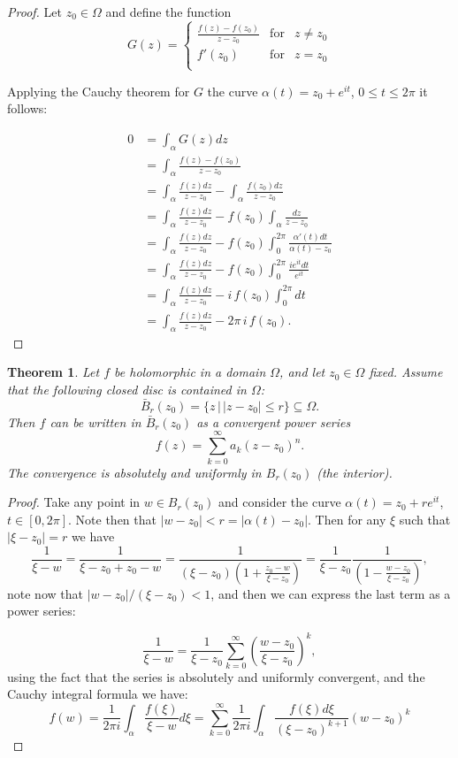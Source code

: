 \documentclass{amsart}
\newtheorem{thm}{Theorem}
\begin{document}
\begin{proof}
Let \(z_0 \in \Omega\) and define the function
\[ G(z) = \left\{ \begin{array}{ccc}
\frac{f(z) - f(z_0)}{z - z_0} & \mbox{for} & z \neq z_0\\
f'(z_0) & \mbox{for} & z = z_0\\
\end{array} \right. \]

Applying the Cauchy theorem for \(G\) the curve \(\alpha(t) = z_0 + e^{it}\), \(0\leq t \leq 2\pi\)  it follows:

\begin{align*}
0 & =  \int_{\alpha} G(z) dz \\ 
& = \int_{\alpha} \frac{f(z) - f(z_0)}{z-z_0} \\ 
&= \int_{\alpha}\frac{f(z)dz}{z-z_0} - \int_{\alpha}\frac{f(z_0) dz}{z - z_0} \\
&= \int_{\alpha}\frac{f(z)dz}{z-z_0} - f(z_0) \int_{\alpha}\frac{dz}{z - z_0}\\
&= \int_{\alpha}\frac{f(z)dz}{z-z_0} - f(z_0) \int_{0}^{2\pi}\frac{\alpha'(t)dt}{\alpha(t) - z_0}\\
&= \int_{\alpha}\frac{f(z)dz}{z-z_0} - f(z_0) \int_{0}^{2\pi}\frac{i e^{it}dt}{e^{it}}\\
&= \int_{\alpha}\frac{f(z)dz}{z-z_0} - i\, f(z_0) \int_{0}^{2\pi}dt\\
&= \int_{\alpha}\frac{f(z)dz}{z-z_0} - 2\pi\,i\, f(z_0).
\end{align*}
\end{proof}


\begin{thm}
Let \(f\) be holomorphic in a domain \(\Omega\), and let \(z_0\in \Omega\) fixed. Assume that the following closed disc is contained in \(\Omega\):
\[ \bar{B}_r(z_0) = \{ z \, | \, |z-z_0| \leq r \} \subseteq \Omega. \]
Then \(f\) can be written in \(\bar{B}_r(z_0)\) as a convergent power series 
\[ f(z) = \sum_{k=0}^\infty a_k (z - z_0)^n.\]
The convergence is absolutely and uniformly in \(B_r(z_0)\) (the interior).
\end{thm}

\begin{proof}
Take any point in \(w\in B_r(z_0)\) and consider the curve \(\alpha(t) = z_0 + r e^{it}\), \(t\in [0,2\pi]\). Note then that \(|w-z_0| < r = |\alpha(t) - z_0|\). Then for any \(\xi\) such that \(|\xi - z_0| = r\) we have
\[ \frac{1}{\xi - w} = \frac{1}{\xi - z_0 + z_0 - w} = \frac{1}{(\xi - z_0)\left( 1 + \frac{z_0 - w }{ \xi - z_0}\right) }= \frac{1}{\xi - z_0}\frac{1}{\left( 1 - \frac{w - z_0 }{ \xi - z_0}\right) }, \]
note now that \(|w-z_0|/(\xi-z_0) < 1\), and then we can express the last term as  a power series:

\[ \frac{1}{\xi - w}  = \frac{1}{\xi-z_0}\sum_{k=0}^{\infty}\left( \frac{w - z_0 }{ \xi - z_0}\right)^k, \]
using the fact that  the series is absolutely and uniformly convergent, and the Cauchy integral formula we have:
\[ f(w) = \frac{1}{2\pi i} \int_{\alpha} \frac{f(\xi)}{\xi - w}d\xi = \sum_{k = 0}^{\infty}\frac{1}{2\pi i} \int_{\alpha} \frac{f(\xi)d\xi}{(\xi - z_0)^{k+1}} (w - z_0)^k \]
\end{proof}
\end{document}
